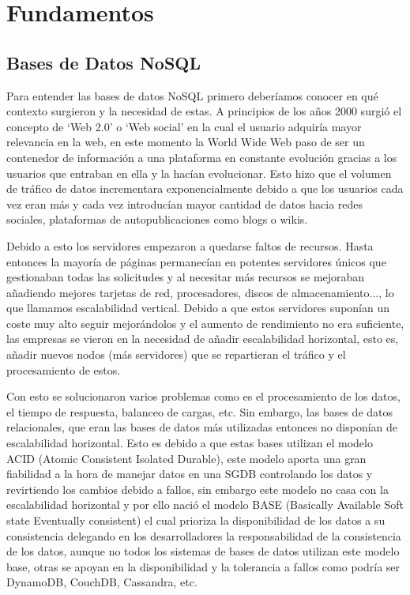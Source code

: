 \chapter{Fundamentos\label{02fundamentos}}

\section{Bases de Datos NoSQL\label{02intro_NoSQL}}

Para entender las bases de datos NoSQL primero deberíamos conocer en qué contexto surgieron y la necesidad de estas. A principios de los años 2000 surgió el concepto de `Web 2.0' o `Web social' en la cual el usuario adquiría mayor relevancia en la web, en este momento la World Wide Web paso de ser un contenedor de información a una plataforma en constante evolución gracias a los usuarios que entraban en ella y la hacían evolucionar. Esto hizo que el volumen de tráfico de datos incrementara exponencialmente debido a que los usuarios cada vez eran más y cada vez introducían mayor cantidad de datos hacia redes sociales, plataformas de autopublicaciones como blogs o wikis. 

Debido a esto los servidores empezaron a quedarse faltos de recursos. Hasta entonces la mayoría de páginas permanecían en potentes servidores únicos que gestionaban todas las solicitudes y al necesitar más recursos se mejoraban añadiendo mejores tarjetas de red, procesadores, discos de almacenamiento..., lo que llamamos escalabilidad vertical. Debido a que estos servidores suponían un coste muy alto seguir mejorándolos y el aumento de rendimiento no era suficiente, las empresas se vieron en la necesidad de añadir escalabilidad horizontal, esto es, añadir nuevos nodos (más servidores) que se repartieran el tráfico y el procesamiento de estos.

Con esto se solucionaron varios problemas como es el procesamiento de los datos, el tiempo de respuesta, balanceo de cargas, etc. Sin embargo, las bases de datos relacionales, que eran las bases de datos más utilizadas entonces no disponían de escalabilidad horizontal. Esto es debido a que estas bases utilizan el modelo ACID (Atomic Consistent Isolated Durable), este modelo aporta una gran fiabilidad a la hora de manejar datos en una SGDB controlando los datos y revirtiendo los cambios debido a fallos, sin embargo este modelo no casa con la escalabilidad horizontal y por ello nació el modelo BASE (Basically Available Soft state Eventually consistent) el cual prioriza la disponibilidad de los datos a su consistencia delegando en los desarrolladores la responsabilidad de la consistencia de los datos, aunque no todos los sistemas de bases de datos utilizan este modelo base, otras se apoyan en la disponibilidad y la tolerancia a fallos como podría ser DynamoDB, CouchDB, Cassandra, etc.

